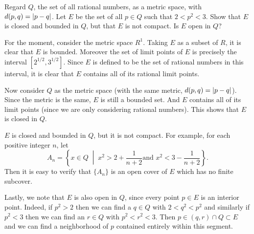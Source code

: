  Regard $Q$, the set of all rational numbers, as a metric
space, with $d(p,q) = \lvert{p-q}\rvert$. Let $E$ be the set of all $p\in Q$
such that $2<p^2<3$. Show that $E$ is closed and bounded in $Q$, but
that $E$ is not compact. Is $E$ open in $Q$?
\begin{solution}
  For the moment, consider the metric space $R^1$. Taking $E$ as a
  subset of $R$, it is clear that $E$ is bounded. Moreover the set of
  limit points of $E$ is precisely the interval
  $[2^{1/2},3^{1/2}]$. Since $E$ is defined to be the set of rational
  numbers in this interval, it is clear that $E$ contains all of its
  rational limit points.

  Now consider $Q$ as the metric space (with the same metric,
  $d(p,q)=\lvert{p-q}\rvert$). Since the metric is the same, $E$ is still a
  bounded set. And $E$ contains all of its limit points (since we are
  only considering rational numbers). This shows that $E$ is closed in
  $Q$.

  $E$ is closed and bounded in $Q$, but it is not compact. For
  example, for each positive integer $n$, let
  \begin{equation*}
    A_n = \left\{ x\in Q
      \;\middle|\;
      \text{$x^2 > 2 + \frac1{n+2}$
        and $x^2 < 3 - \frac1{n+2}$} \right\}.
  \end{equation*}
  Then it is easy to verify that $\{A_n\}$ is an open cover of $E$
  which has no finite subcover.

  Lastly, we note that $E$ is also open in $Q$, since every point
  $p\in E$ is an interior point. Indeed, if $p^2 > 2$ then we can find
  a $q\in Q$ with $2 < q^2 < p^2$ and similarly if $p^2 < 3$ then we
  can find an $r\in Q$ with $p^2 < r^2 < 3$. Then
  $p\in(q,r)\cap Q\subset E$ and we can find a neighborhood of $p$
  contained entirely within this segment.
\end{solution}

